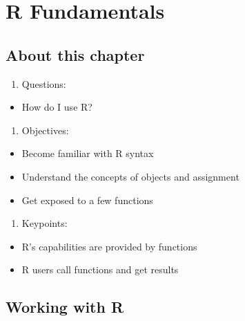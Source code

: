 \documentclass[
]{book}
\providecommand{\tightlist}{%
  \setlength{\itemsep}{0pt}\setlength{\parskip}{0pt}}
\begin{document}
\hypertarget{r-fundamentals}{%
\chapter{R Fundamentals}\label{r-fundamentals}}

\hypertarget{about-this-chapter}{%
\section{About this chapter}\label{about-this-chapter}}

\begin{enumerate}
\def\labelenumi{\arabic{enumi}.}
\tightlist
\item
  Questions:
\end{enumerate}

\begin{itemize}
\tightlist
\item
  How do I use R?
\end{itemize}

\begin{enumerate}
\def\labelenumi{\arabic{enumi}.}
\setcounter{enumi}{1}
\tightlist
\item
  Objectives:
\end{enumerate}

\begin{itemize}
\tightlist
\item
  Become familiar with R syntax
\item
  Understand the concepts of objects and assignment
\item
  Get exposed to a few functions
\end{itemize}

\begin{enumerate}
\def\labelenumi{\arabic{enumi}.}
\setcounter{enumi}{2}
\tightlist
\item
  Keypoints:
\end{enumerate}

\begin{itemize}
\tightlist
\item
  R's capabilities are provided by functions
\item
  R users call functions and get results
\end{itemize}

\hypertarget{working-with-r}{%
\section{Working with R}\label{working-with-r}}
\end{document}
